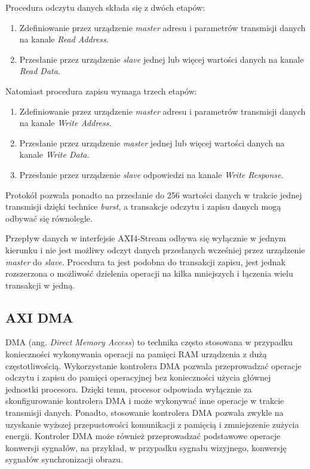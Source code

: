 Procedura odczytu danych składa się z dwóch etapów:
\begin{enumerate}
	\item Zdefiniowanie  przez urządzenie \emph{master} adresu i parametrów transmisji danych na kanale \emph{Read Address}.
	\item Przesłanie przez urządzenie \emph{slave} jednej lub więcej wartości danych na kanale \emph{Read Data}.
\end{enumerate}

Natomiast procedura zapisu wymaga trzech etapów:
\begin{enumerate}
	\item Zdefiniowanie  przez urządzenie \emph{master} adresu i parametrów transmisji danych na kanale \emph{Write Address}.
	\item Przesłanie przez urządzenie \emph{master} jednej lub więcej wartości danych na kanale \emph{Write Data}.
	\item Przesłanie przez urządzenie \emph{slave} odpowiedzi na kanale \emph{Write Response}.
\end{enumerate}

Protokół pozwala ponadto na przesłanie do 256 wartości danych w trakcie jednej transmisji dzięki technice \emph{burst}, a transakcje odczytu i zapisu danych mogą odbywać się równolegle.

Przepływ danych w interfejsie AXI4-Stream odbywa się wyłącznie w jednym kierunku i nie jest możliwy odczyt danych przesłanych wcześniej przez urządzenie \emph{master} do \emph{slave}. Procedura ta jest podobna do transakcji zapisu, jest jednak rozszerzona o możliwość dzielenia operacji na kilka mniejszych i łączenia wielu transakcji w jedną.

\subsection{AXI DMA}
DMA (ang. \emph{Direct Memory Access}) to technika często stosowana w przypadku konieczności wykonywania operacji na pamięci RAM urządzenia z dużą częstotliwością. Wykorzystanie kontrolera DMA pozwala przeprowadzać operacje odczytu i zapisu do pamięci operacyjnej bez konieczności użycia głównej jednostki procesora. Dzięki temu, procesor odpowiada wyłącznie za skonfigurowanie kontrolera DMA i może wykonywać inne operacje w trakcie transmisji danych. Ponadto, stosowanie kontrolera DMA pozwala zwykle na uzyskanie wyższej przepustowości komunikacji z pamięcią i zmniejszenie zużycia energii. Kontroler DMA może również przeprowadzać podstawowe operacje konwersji sygnałów, na przykład, w przypadku sygnału wizyjnego, konwersję sygnałów synchronizacji obrazu. 

